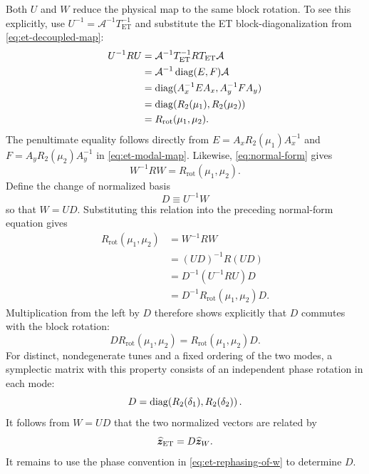Both $U$ and $W$ reduce the physical map to the same block rotation.  To see
this explicitly, use
$U^{-1}=\mathcal A^{-1}T_{\mathrm{ET}}^{-1}$ and substitute the ET
block-diagonalization from \cref{eq:et-decoupled-map}:
\begin{align}
 U^{-1}RU
 &=\mathcal A^{-1}T_{\mathrm{ET}}^{-1}
   RT_{\mathrm{ET}}\mathcal A
 \nonumber\\
 &=\mathcal A^{-1}\operatorname{diag}(E,F)\mathcal A
 \nonumber\\
 &=\operatorname{diag}(A_x^{-1}EA_x,A_y^{-1}FA_y)
 \nonumber\\
 &=\operatorname{diag}(R_2(\mu_1),R_2(\mu_2))
 \nonumber\\
 &=R_{\mathrm{rot}}(\mu_1,\mu_2).
 \label{eq:U-normalizes-R}
\end{align}
The penultimate equality follows directly from
$E=A_xR_2(\mu_1)A_x^{-1}$ and $F=A_yR_2(\mu_2)A_y^{-1}$ in
\cref{eq:et-modal-map}.
Likewise, \cref{eq:normal-form} gives
\begin{equation}
 W^{-1}RW=R_{\mathrm{rot}}(\mu_1,\mu_2).
\end{equation}
Define the change of normalized basis
\begin{equation}
 D\equiv U^{-1}W
 \label{eq:D-definition}
\end{equation}
so that $W=UD$.  Substituting this relation into the preceding normal-form
equation gives
\begin{align}
 R_{\mathrm{rot}}(\mu_1,\mu_2)
 &=W^{-1}RW \nonumber\\
 &=(UD)^{-1}R(UD) \nonumber\\
 &=D^{-1}(U^{-1}RU)D \nonumber\\
 &=D^{-1}R_{\mathrm{rot}}(\mu_1,\mu_2)D.
\end{align}
Multiplication from the left by $D$ therefore shows explicitly that $D$
commutes with the block rotation:
\begin{equation}
 DR_{\mathrm{rot}}(\mu_1,\mu_2)
 =R_{\mathrm{rot}}(\mu_1,\mu_2)D.
\end{equation}
For distinct, nondegenerate tunes and a fixed ordering of the two modes, a
symplectic matrix with this property consists of an independent phase rotation
in each mode:
\begin{equation}
 D=\operatorname{diag}\!\left(R_2(\delta_1),R_2(\delta_2)\right).
 \label{eq:D-phase-rotations}
\end{equation}
It follows from $W=UD$ that the two normalized vectors are related by
\begin{equation}
 \widehat{\bm{z}}_{\mathrm{ET}}=D\widehat{\bm{z}}_W.
 \label{eq:normalized-coordinate-gauges}
\end{equation}
It remains to use the phase convention in \cref{eq:et-rephasing-of-w} to
determine $D$.

